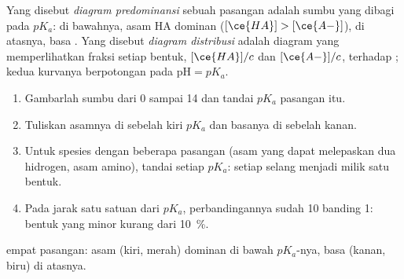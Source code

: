 \begin{definition}\label{def:g12:buffers-predominance:predominance}
Yang disebut \emph{diagram predominansi}
sebuah pasangan adalah sumbu  yang dibagi pada $pK_a$: di bawahnya,
asam HA dominan ($[\ce{HA}] > [\ce{A-}]$), di atasnya, basa .
Yang disebut \emph{diagram distribusi} adalah
diagram yang memperlihatkan fraksi setiap bentuk, $[\ce{HA}]/c$ dan $[\ce{A-}]/c$, terhadap ;
kedua kurvanya berpotongan pada $\mathrm{pH} = pK_a$.
\end{definition}

\begin{method}\label{met:g12:buffers-predominance:diagram}
\begin{enumerate}
  \item Gambarlah sumbu  dari 0 sampai 14 dan tandai $pK_a$ pasangan
        itu.
  \item Tuliskan asamnya di sebelah kiri $pK_a$ dan basanya di sebelah
        kanan.
  \item Untuk spesies dengan beberapa pasangan (asam yang dapat
        melepaskan dua hidrogen, asam amino), tandai setiap $pK_a$:
        setiap selang menjadi milik satu bentuk.
  \item Pada jarak satu satuan dari $pK_a$, perbandingannya sudah 10
        banding 1: bentuk yang minor kurang dari \qty{10}{\percent}.
\end{enumerate}
\end{method}

\begin{omfigure}

{\small {} empat pasangan: asam (kiri, merah) dominan
di bawah $pK_a$-nya, basa (kanan, biru) di atasnya.}
\end{omfigure}


